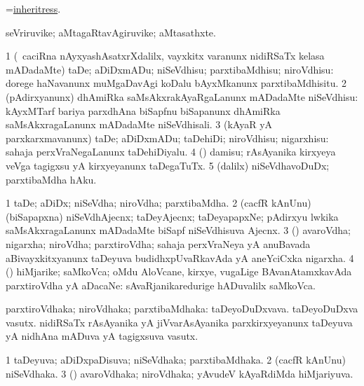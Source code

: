 \bentry
{}
\gl{\nA}
\bmng
=\hyperlink{inheritress}{inheritress}. 
\emng
\eentry

\bentry
{}
\gl{\nA}
\bmng
seVriruvike; aMtagaRtavAgiruvike; aMtasathxte. 
\emng
\eentry

\bentry
{}
\gl{\sakirx}
\bmng
\bnum
\num{1} (\kanmu\ caciRna nAyxyashAsatxrXdalilx, vayxkitx \mo varanunx nidiRSaTx kelasa mADadaMte) taDe; aDiDxmADu; niSeVdhisu; parxtibaMdhisu; niroVdhisu:  dorege haNavanunx muMgaDavAgi koDalu bAyxMkanunx parxtibaMdhisitu. 
\num{2} (pAdirxyanunx) dhAmiRka saMsAkxrakAyaRgaLanunx mADadaMte niSeVdhisu:  kAyxMTarf bariya parxdhAna biSapfnu biSapanunx dhAmiRka saMsAkxragaLanunx mADadaMte niSeVdhisali. 
\num{3} (kAyaR yA parxkarxmavanunx) taDe; aDiDxmADu; taDehiDi; niroVdhisu; nigarxhisu:  sahaja perxVraNegaLanunx taDehiDiyalu. 
\num{4} (\ravi) damisu; rAsAyanika kirxyeya veVga tagigxsu yA kirxyeyanunx taDegaTuTx. 
\num{5} (\BUkaq dalilx) niSeVdhavoDuDx; parxtibaMdha hAku. 
\enum
\emng
\eentry

\bentry
{}
\gl{\nA}
\bmng
\bnum
\num{1} taDe; aDiDx; niSeVdha; niroVdha; parxtibaMdha. 
\num{2} (cacfR kAnUnu) (biSapapxna) niSeVdhAjecnx; taDeyAjecnx; taDeyapapxNe; pAdirxyu lwkika saMsAkxragaLanunx mADadaMte biSapf niSeVdhisuva Ajecnx. 
\num{3} (\mashA) avaroVdha; nigarxha; niroVdha; parxtiroVdha; sahaja perxVraNeya yA anuBavada aBivayxkitxyanunx taDeyuva budidhxpUvaRkavAda yA aneYciCxka nigarxha. 
\num{4} (\AmA) hiMjarike; saMkoVca; oMdu AloVcane, kirxye, \mo vugaLige BAvanAtamxkavAda parxtiroVdha yA aDacaNe:  sAvaRjanikaredurige hADuvalilx saMkoVca. 
\enum
\emng
\eentry

\bentry
{}
\gl{\nA}
\bmng
parxtiroVdhaka; niroVdhaka; parxtibaMdhaka: 
\banum
{} taDeyoDuDxvava. 
 taDeyoDuDxva vasutx. 
 nidiRSaTx rAsAyanika yA jiVvarAsAyanika parxkirxyeyanunx taDeyuva yA nidhAna mADuva yA tagigxsuva vasutx. 
\eanum
\emng
\eentry

\bentry
{}
\gl{\gu}
\bmng
\bnum
\num{1} taDeyuva; aDiDxpaDisuva; niSeVdhaka; parxtibaMdhaka. 
\num{2} (cacfR kAnUnu) niSeVdhaka. 
\num{3} (\mashA) avaroVdhaka; niroVdhaka; yAvudeV kAyaRdiMda hiMjariyuva. 
\enum
\emng
\eentry

